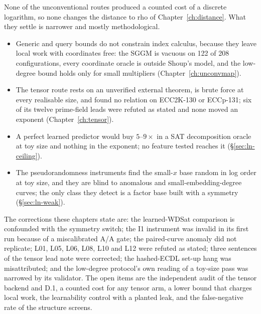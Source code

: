 None of the unconventional routes produced a counted cost of a discrete
logarithm, so none changes the distance to rho of Chapter~\ref{ch:distance}.
What they settle is narrower and mostly methodological.
\begin{itemize}
\item Generic and query bounds do not constrain index calculus, because
  they leave local work with coordinates free: the SGGM is vacuous on 122 of
  208 configurations, every coordinate oracle is outside Shoup's model, and
  the low-degree bound holds only for small multipliers
  (Chapter~\ref{ch:unconvmap}).
\item The tensor route rests on an unverified external theorem, is brute
  force at every realisable size, and found no relation on ECC2K-130 or
  ECCp-131; six of its twelve prime-field leads were refuted as stated and
  none moved an exponent (Chapter~\ref{ch:tensor}).
\item A perfect learned predictor would buy $5$--$9\times$ in a SAT
  decomposition oracle at toy size and nothing in the exponent; no feature
  tested reaches it (\S\ref{sec:ln-ceiling}).
\item The pseudorandomness instruments find the small-$x$ base random in log
  order at toy size, and they are blind to anomalous and small-embedding-degree
  curves; the only class they detect is a factor base built with a symmetry
  (\S\ref{sec:ln-weak}).
\end{itemize}
The corrections these chapters state are: the learned-WDSat comparison is
confounded with the symmetry switch; the I1 instrument was invalid in its
first run because of a miscalibrated A/A gate; the paired-curve anomaly did
not replicate; L01, L05, L06, L08, L10 and L12 were refuted as stated; three
sentences of the tensor lead note were corrected; the hashed-ECDL set-up hang
was misattributed; and the low-degree protocol's own reading of a toy-size
pass was narrowed by its validator. The open items are the independent audit
of the tensor backend and D.1, a counted cost for any tensor arm, a lower
bound that charges local work, the learnability control with a planted leak,
and the false-negative rate of the structure screens.
